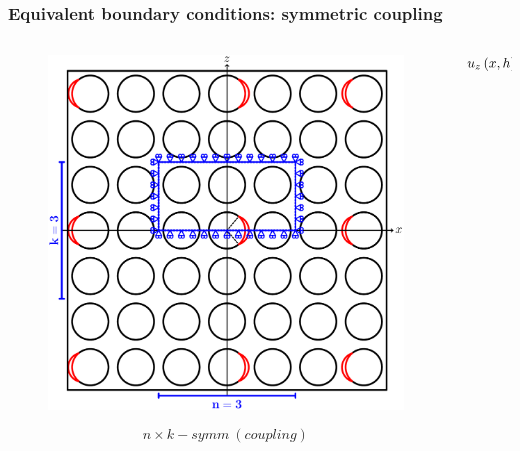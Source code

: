 \documentclass[first,firstsupp,lastsupp,last,hyperref,table]{ETHclass}
\begin{document}
\begin{frame}
\frametitle{\vspace{0.2cm}\small Equivalent boundary conditions: symmetric coupling}
\vspace{-1.25cm}
\centering
\begin{columns}[c]
\begin{column}{0.5\textwidth}
\centering
\begin{figure}
\centering
\includegraphics[width=\columnwidth]{coupling.pdf}
\end{figure}
\vspace{-0.25cm}
\begin{equation*}
n\times k-symm\ (coupling)
\end{equation*}
\end{column}
\begin{column}{0.5\textwidth}
\centering
\begin{equation*}
\scriptsize
u_{z}\left(x,h\right)=\bar{u}_{z}\left(x,h\right)
\end{equation*}
\end{column}
\end{columns}
\end{frame}
\end{document}
